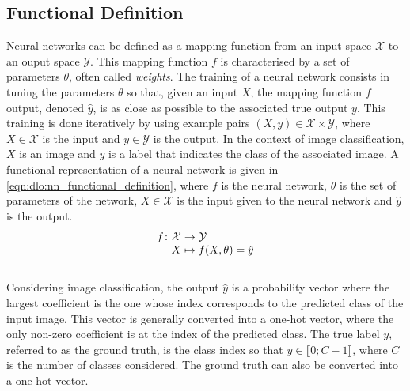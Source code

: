 \subsection{Functional Definition}

Neural networks can be defined as a mapping function from an input space
$\mathcal{X}$ to an ouput space $\mathcal{Y}$. This mapping function $f$ is
characterised by a set of parameters $\theta$, often called \emph{weights}. The
training of a neural network consists in tuning the parameters $\theta$ so that,
given an input $X$, the mapping function $f$ output, denoted $\hat{y}$, is as
close as possible to the associated true output $y$. This training is done
iteratively by using example pairs $(X, y) \in \mathcal{X} \times \mathcal{Y}$,
where $X\in\mathcal{X}$ is the input and $y\in\mathcal{Y}$ is the output. In the
context of image classification, $X$ is an image and $y$ is a label that
indicates the class of the associated image. A functional representation of a
neural network is given in \cref{eqn:dlo:nn_functional_definition}, where $f$ is
the neural network, $\theta$ is the set of parameters of the network,
$X\in\mathcal{X}$ is the input given to the neural network and $\hat{y}$ is the
output.\\

\begin{equation}
  \label{eqn:dlo:nn_functional_definition}
  \begingroup
  \setlength\arraycolsep{0pt}
  f \colon\begin{array}[t]{c >{{}}c<{{}} l}
    \mathcal{X} & \to     & \mathcal{Y} \\
    X                     & \mapsto & f(X, \theta) = \hat{y}
  \end{array}
  \endgroup
\end{equation}\\


Considering image classification,  the output $\hat{y}$ is a probability vector
where the largest coefficient is the one whose index corresponds to the
predicted class of the input image. This vector is generally converted into a
one-hot vector, where the only non-zero coefficient is at the index of the
predicted class. The true label $y$, referred to as the ground truth, is the
class index so that $y\in\llbracket0;C-1\rrbracket$, where $C$ is the number of
classes considered. The ground truth can also be converted into a one-hot
vector.\\


